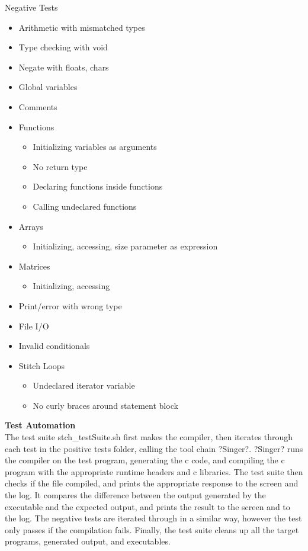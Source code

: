 \documentclass[11pt, oneside]{article}   	%
\begin{document}
Negative Tests\\
\begin{itemize}
\item Arithmetic with mismatched types
\item Type checking with void
\item Negate with floats, chars
\item Global variables
\item Comments
\item Functions
\begin{itemize}
\item Initializing variables as arguments
\item No return type
\item Declaring functions inside functions
\item Calling undeclared functions
\end{itemize}
\item Arrays
\begin{itemize}
\item Initializing, accessing, size parameter as expression
\end{itemize}
\item Matrices
\begin{itemize}
\item Initializing, accessing
\end{itemize}
\item Print/error with wrong type
\item File I/O
\item Invalid conditionals
\item Stitch Loops
\begin{itemize}
\item Undeclared iterator variable
\item No curly braces around statement block
\end{itemize}
\end{itemize}
\newpage

\Large\textbf{Test Automation}\\[1em]
\normalsize
The test suite stch\_testSuite.sh first makes the compiler, then iterates through each test in the positive tests folder, calling the tool chain ?Singer?. ?Singer? runs the compiler on the test program, generating the c code, and compiling the c program with the appropriate runtime headers and c libraries. The test suite then checks if the file compiled, and prints the appropriate response to the screen and the log. It compares the difference between the output generated by the executable and the expected output, and prints the result to the screen and to the log. The negative tests are iterated through in a similar way, however the test only passes if the compilation fails. Finally, the test suite cleans up all the target programs, generated output, and executables.
\end{document}
